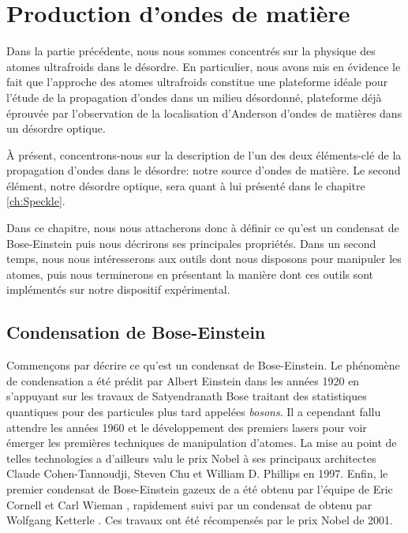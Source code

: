 \chapter{Production d'ondes de matière}
\label{ch:BEC_manip}

Dans la partie précédente, nous nous sommes concentrés sur la physique des atomes ultrafroids dans le désordre. En particulier, nous avons mis en évidence le fait que l'approche des atomes ultrafroids constitue une plateforme idéale pour l'étude de la propagation d'ondes dans un milieu désordonné, plateforme déjà éprouvée par l'observation de la localisation d'Anderson d'ondes de matières dans un désordre optique. 

À présent, concentrons-nous sur la description de l'un des deux éléments-clé de la propagation d'ondes dans le désordre: notre source d'ondes de matière. Le second élément, notre désordre optique, sera quant à lui présenté dans le chapitre \ref{ch:Speckle}.

Dans ce chapitre, nous nous attacherons donc à définir ce qu'est un condensat de Bose-Einstein puis nous décrirons ses principales propriétés. Dans un second temps, nous nous intéresserons aux outils dont nous disposons pour manipuler les atomes, puis nous terminerons en présentant la manière dont ces outils sont implémentés sur notre dispositif expérimental. 

\section{Condensation de Bose-Einstein}
Commençons par décrire ce qu'est un condensat de Bose-Einstein. Le phénomène de condensation a été prédit par Albert Einstein dans les années 1920 en s'appuyant sur les travaux de Satyendranath Bose traitant des statistiques quantiques pour des particules plus tard appelées \emph{bosons}. Il a cependant fallu attendre les années 1960 et le développement des premiers lasers pour voir émerger les premières techniques de manipulation d'atomes. La mise au point de telles technologies a d'ailleurs valu le prix Nobel à ses principaux architectes Claude Cohen-Tannoudji, Steven Chu et William D. Phillips en 1997. Enfin, le premier condensat de Bose-Einstein gazeux de  a été obtenu par l'équipe de Eric Cornell et Carl Wieman \citep{anderson1995observation}, rapidement suivi par un condensat de  obtenu par Wolfgang Ketterle \citep{davis1995bose}. Ces travaux ont été récompensés par le prix Nobel de 2001.

